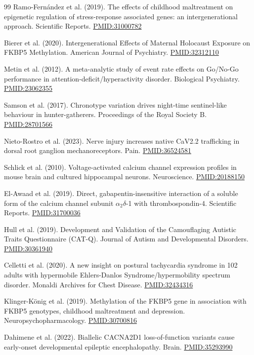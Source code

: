 \begin{thebibliography}{99}
 Ramo-Fernández et al. (2019). The effects of childhood maltreatment on epigenetic regulation of stress-response associated genes: an intergenerational approach. Scientific Reports. \href{https://pubmed.ncbi.nlm.nih.gov/31000782/}{PMID:31000782}

 Bierer et al. (2020). Intergenerational Effects of Maternal Holocaust Exposure on FKBP5 Methylation. American Journal of Psychiatry. \href{https://pubmed.ncbi.nlm.nih.gov/32312110/}{PMID:32312110}

 Metin et al. (2012). A meta-analytic study of event rate effects on Go/No-Go performance in attention-deficit/hyperactivity disorder. Biological Psychiatry. \href{https://pubmed.ncbi.nlm.nih.gov/23062355/}{PMID:23062355}

 Samson et al. (2017). Chronotype variation drives night-time sentinel-like behaviour in hunter-gatherers. Proceedings of the Royal Society B. \href{https://pubmed.ncbi.nlm.nih.gov/28701566/}{PMID:28701566}

 Nieto-Rostro et al. (2023). Nerve injury increases native CaV2.2 trafficking in dorsal root ganglion mechanoreceptors. Pain. \href{https://pubmed.ncbi.nlm.nih.gov/36524581/}{PMID:36524581}

 Schlick et al. (2010). Voltage-activated calcium channel expression profiles in mouse brain and cultured hippocampal neurons. Neuroscience. \href{https://pubmed.ncbi.nlm.nih.gov/20188150/}{PMID:20188150}

 El-Awaad et al. (2019). Direct, gabapentin-insensitive interaction of a soluble form of the calcium channel subunit \ensuremath{\alpha_2\delta}-1 with thrombospondin-4. Scientific Reports. \href{https://pubmed.ncbi.nlm.nih.gov/31700036/}{PMID:31700036}

 Hull et al. (2019). Development and Validation of the Camouflaging Autistic Traits Questionnaire (CAT-Q). Journal of Autism and Developmental Disorders. \href{https://pubmed.ncbi.nlm.nih.gov/30361940/}{PMID:30361940}

 Celletti et al. (2020). A new insight on postural tachycardia syndrome in 102 adults with hypermobile Ehlers-Danlos Syndrome/hypermobility spectrum disorder. Monaldi Archives for Chest Disease. \href{https://pubmed.ncbi.nlm.nih.gov/32434316/}{PMID:32434316}

 Klinger-König et al. (2019). Methylation of the FKBP5 gene in association with FKBP5 genotypes, childhood maltreatment and depression. Neuropsychopharmacology. \href{https://pubmed.ncbi.nlm.nih.gov/30700816/}{PMID:30700816}

 Dahimene et al. (2022). Biallelic CACNA2D1 loss-of-function variants cause early-onset developmental epileptic encephalopathy. Brain. \href{https://pubmed.ncbi.nlm.nih.gov/35293990/}{PMID:35293990}

\end{thebibliography}
